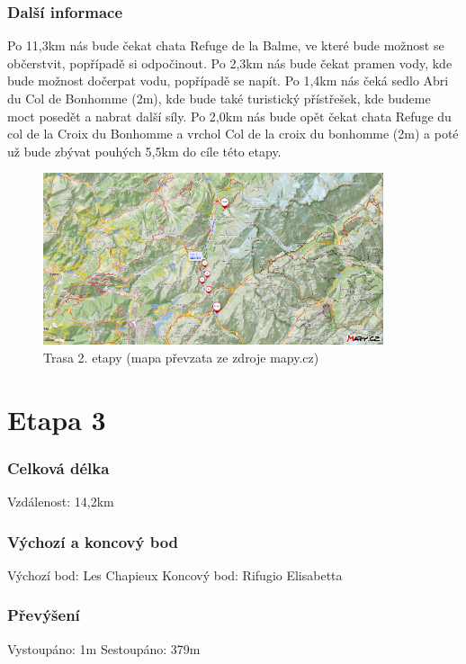 \subsubsection*{Další informace}
Po 11,3\:km nás bude čekat chata Refuge de la Balme, ve které bude možnost se občerstvit, popřípadě si odpočinout. Po 2,3\:km nás bude čekat pramen vody, kde bude možnost dočerpat vodu, popřípadě se napít. Po 1,4\:km nás čeká sedlo Abri du Col de Bonhomme (2\:m), kde bude také turistický přístřešek, kde budeme moct posedět a nabrat další síly. Po 2,0\:km nás bude opět čekat chata Refuge du col de la Croix du Bonhomme a vrchol Col de la croix du bonhomme (2\:m) a poté už bude zbývat pouhých 5,5\:km do cíle této etapy.
\begin{figure}[!hbt]
    \centering
    \includegraphics[width=10.0cm]{Figures/day_2.png}
    \caption[Trasa: den druhý]{Trasa 2. etapy (mapa převzata ze zdroje mapy.cz)}
    \label{Obr:day_2}
\end{figure} 
\section{Etapa 3}
\subsubsection*{Celková délka}
\noindent Vzdálenost: 14,2\:km
\subsubsection*{Výchozí a koncový bod}
\noindent Výchozí bod: Les Chapieux
\noindent Koncový bod: Rifugio Elisabetta
\subsubsection*{Převýšení}
\noindent Vystoupáno: 1\:m
\noindent Sestoupáno: 379\:m
